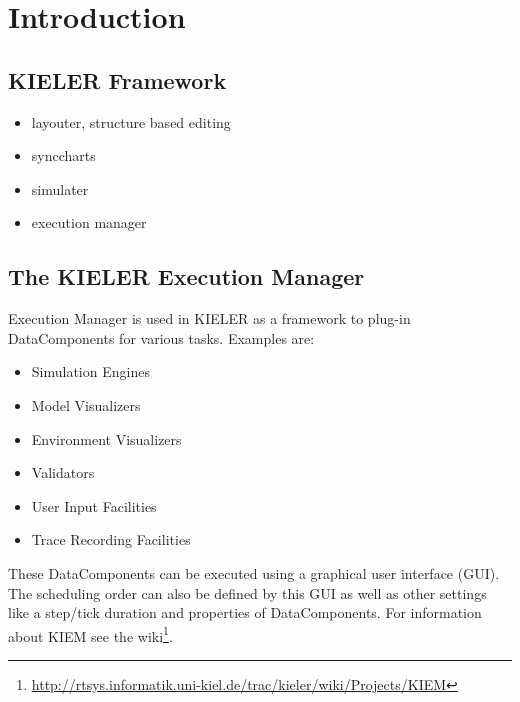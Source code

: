 

\chapter{Introduction}
\label{chapter:introduction}
\section{KIELER Framework}
\label{sec:intro/Kieler}
\begin{itemize}
 \item layouter, structure based editing
 \item synccharts
 \item simulater
 \item execution manager
\end{itemize}
\section{The KIELER Execution Manager}
\label{sec:intro/Kiem}
Execution Manager is used in KIELER as a framework to plug-in DataComponents for various tasks. Examples are:
\begin{itemize}
 \item Simulation Engines
 \item Model Visualizers
 \item Environment Visualizers
 \item Validators
 \item User Input Facilities
 \item Trace Recording Facilities 
\end{itemize}

These DataComponents can be executed using a graphical user interface (GUI). 
The scheduling order can also be defined by this GUI as well as other settings like a step/tick duration and properties of DataComponents.
For information about \ac{KIEM} see the wiki\footnote{\url{http://rtsys.informatik.uni-kiel.de/trac/kieler/wiki/Projects/KIEM}}.
